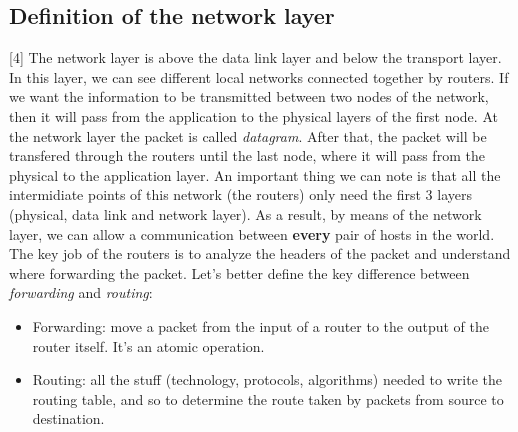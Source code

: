 \subsection{Definition of the network layer} [4]
The network layer is above the data link layer and below the transport layer. In this layer, we can see different local networks connected together by routers. If we want the information to be transmitted between two nodes of the network, then it will pass from the application to the physical layers of the first node. At the network layer the packet is called \textit{datagram}. After that, the packet will be transfered through the routers until the last node, where it will pass from the physical to the application layer. An important thing we can note is that all the intermidiate points of this network (the routers) only need the first 3 layers (physical, data link and network layer). As a result, by means of the network layer, we can allow a communication between \textbf{every} pair of hosts in the world. The key job of the routers is to analyze the headers of the packet and understand where forwarding the packet. Let's better define the key difference between \textit{forwarding} and \textit{routing}:
\begin{itemize}
    \item Forwarding: move a packet from the input of a router to the output of the router itself. It's an atomic operation.
    \item Routing: all the stuff (technology, protocols, algorithms) needed to write the routing table, and so to determine the route taken by packets from source to destination.
\end{itemize}

